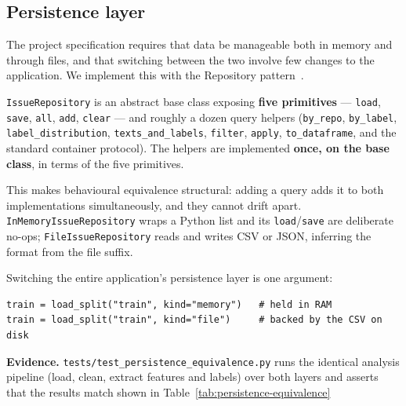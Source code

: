 \subsection{Persistence layer}
\label{sec:persistence}
 
The project specification requires that data be manageable both in memory and
through files, and that switching between the two involve few changes to the
application. We implement this with the Repository pattern~\cite{fowler2002peaa}.
 
\texttt{IssueRepository} is an abstract base class exposing \textbf{five primitives}
--- \texttt{load}, \texttt{save}, \texttt{all}, \texttt{add}, \texttt{clear} --- and
roughly a dozen query helpers (\texttt{by\_repo}, \texttt{by\_label},
\texttt{label\_distribution}, \texttt{texts\_and\_labels}, \texttt{filter},
\texttt{apply}, \texttt{to\_dataframe}, and the standard container protocol). The
helpers are implemented \textbf{once, on the base class}, in terms of the five
primitives.
 
This makes behavioural equivalence structural: adding a
query adds it to both implementations simultaneously, and they cannot drift apart. \texttt{InMemoryIssueRepository} wraps a Python list and its
\texttt{load}/\texttt{save} are deliberate no-ops; \texttt{FileIssueRepository}
reads and writes CSV or JSON, inferring the format from the file suffix.
 
Switching the entire application's persistence layer is one argument:
 
\begin{verbatim}
train = load_split("train", kind="memory")   # held in RAM
train = load_split("train", kind="file")     # backed by the CSV on disk
\end{verbatim}
 
\textbf{Evidence.} \texttt{tests/test\_persistence\_equivalence.py} runs the
identical analysis pipeline (load, clean, extract features and labels) over
both layers and asserts that the results match shown in Table~\ref{tab:persistence-equivalence}
 
